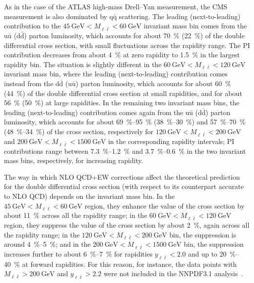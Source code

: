 As in the case of the ATLAS high-mass Drell--Yan measurement, the CMS
measurement is also dominated by $\mathrm{q}\bar{\mathrm{q}}$ scattering. The leading
(next-to-leading) contribution to the $\SI{45}{\giga\electronvolt}<M_{\ell\bar\ell}<\SI{60}{\giga\electronvolt}$ invariant
mass bin comes from
the $\mathrm{u}\bar{\mathrm{u}}$ ($\mathrm{d}\bar{\mathrm{d}}$) parton luminosity, which accounts for about \SI{70}{\percent}
(\SI{22}{\percent}) of the double differential cross section, with small fluctuations across
the rapidity range. The PI contribution decreases from about \SI{4}{\percent} at zero
rapidity to \SI{1.5}{\percent} in the largest rapidity bin. The situation is slightly
different in the $\SI{60}{\giga\electronvolt}<M_{\ell\bar\ell}<\SI{120}{\giga\electronvolt}$ invariant mass bin, where the
leading (next-to-leading) contribution comes instead from the $\mathrm{d}\bar{\mathrm{d}}$
($\mathrm{u}\bar{\mathrm{u}}$) parton luminosity, which accounts for about \SI{60}{\percent} (\SI{44}{\percent}) of the
double differential cross section at small rapidities, and for about \SI{56}{\percent} (\SI{50}{\percent})
at large rapidities. In the remaining two invariant mass bins, the leading
(next-to-leading) contribution comes again from the $\mathrm{u}\bar{\mathrm{u}}$ ($\mathrm{d}\bar{\mathrm{d}}$)
parton luminosity, which accounts for about \SIrange{69}{95}{\percent} (\SIrange{38}{30}{\percent}) and
\SIrange{57}{70}{\percent} (\SIrange{48}{34}{\percent}) of the cross section, respectively for
$\SI{120}{\giga\electronvolt}<M_{\ell\bar\ell}<\SI{200}{\giga\electronvolt}$ and $\SI{200}{\giga\electronvolt}<M_{\ell\bar\ell}<\SI{1500}{\giga\electronvolt}$ in the
corresponding rapidity intervals; PI contributions range between \SIrange{7.3}{1.2}{\percent}
and \SIrange{3.7}{0.6}{\percent} in the two invariant mass bins, respectively, for increasing
rapidity.

The way in which NLO QCD+EW corrections affect the theoretical prediction for
the double differential cross section (with respect to its counterpart accurate
to NLO QCD) depends on the invariant mass bin. In the
$\SI{45}{\giga\electronvolt}<M_{\ell\bar\ell}<\SI{60}{\giga\electronvolt}$ region, they enhance the value of the cross
section by about \SI{11}{\percent} across all the rapidity range; in the
$\SI{60}{\giga\electronvolt}<M_{\ell\bar\ell}<\SI{120}{\giga\electronvolt}$ region, they suppress the value of the cross
section by about \SI{2}{\percent}, again across all the rapidity range; in the
$\SI{120}{\giga\electronvolt}<M_{\ell\bar\ell}<\SI{200}{\giga\electronvolt}$ bin, the suppression is around \SIrange{4}{5}{\percent}; and in
the $\SI{200}{\giga\electronvolt}<M_{\ell\bar\ell}<\SI{1500}{\giga\electronvolt}$ bin, the suppression increases further to
about \SIrange{6}{7}{\percent} for rapidities $y_{\ell\bar\ell}<2.0$ and up to \SIrange{20}{40}{\percent} at forward
rapidities. For this reason, for instance, the data points with
$M_{\ell\bar\ell}>\SI{200}{\giga\electronvolt}$ and $y_{\ell\bar\ell}>2.2$ were not included in the
NNPDF3.1 analysis~\cite{Ball:2017nwa}.

